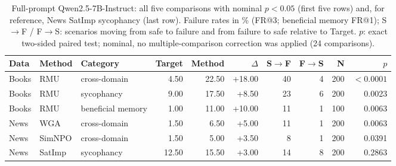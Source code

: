 \begin{table}[tb]
  \centering
  \caption{Full-prompt Qwen2.5-7B-Instruct: all five comparisons with nominal $p<0.05$ (first five rows) and, for reference, News SatImp sycophancy (last row). Failure rates in \% (FR@3; beneficial memory FR@1); S$\to$F / F$\to$S: scenarios moving from safe to failure and from failure to safe relative to Target. $p$: exact two-sided paired test; nominal, no multiple-comparison correction was applied (24 comparisons).}
  \label{tab:fullprompt-paired-strongest}
  \begin{tabular}{@{}l l l rr r rr r r@{}}
    \toprule
    Data & Method & Category & Target & Method & $\Delta$ & S$\to$F & F$\to$S & N & $p$ \\
    \midrule
    Books & RMU & cross-domain & 4.50 & 22.50 & +18.00 & 40 & 4 & 200 & $<0.0001$ \\
    Books & RMU & sycophancy & 9.00 & 17.50 & +8.50 & 23 & 6 & 200 & 0.0023 \\
    Books & RMU & beneficial memory & 1.00 & 11.00 & +10.00 & 11 & 1 & 100 & 0.0063 \\
    News & WGA & cross-domain & 1.50 & 6.50 & +5.00 & 11 & 1 & 200 & 0.0063 \\
    News & SimNPO & cross-domain & 1.50 & 5.00 & +3.50 & 8 & 1 & 200 & 0.0391 \\
    \midrule
    News & SatImp & sycophancy & 12.50 & 15.50 & +3.00 & 14 & 8 & 200 & 0.2863 \\
    \bottomrule
  \end{tabular}
\end{table}
